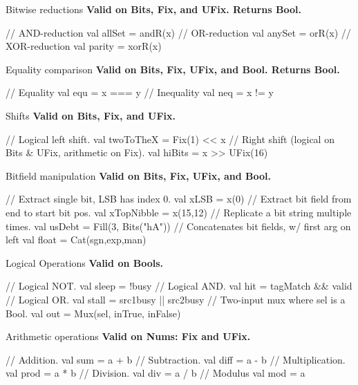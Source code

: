 \documentclass[xcolor=pdflatex,dvipsnames,table]{beamer}
\begin{document}
\begin{frame}[fragile]{Bitwise reductions}
\textbf{Valid on Bits, Fix, and UFix.  Returns Bool.}
\begin{scala}
// AND-reduction 
val allSet = andR(x)  
// OR-reduction
val anySet = orR(x)   
// XOR-reduction 
val parity = xorR(x)  
\end{scala}
\end{frame}

\begin{frame}[fragile]{Equality comparison}
\textbf{Valid on Bits, Fix, UFix, and Bool. Returns Bool.}
\begin{scala}
// Equality
val equ = x === y 
// Inequality 
val neq = x != y   
\end{scala}
\end{frame}

\begin{frame}[fragile]{Shifts}
\textbf{Valid on Bits, Fix, and UFix.}
\begin{scala}
// Logical left shift.
val twoToTheX = Fix(1) << x   
// Right shift (logical on Bits & UFix, arithmetic on Fix).
val hiBits    = x >> UFix(16) 
\end{scala}
\end{frame}

\begin{frame}[fragile]{Bitfield manipulation}
\textbf{Valid on Bits, Fix, UFix, and Bool.}
\begin{scala}
// Extract single bit, LSB has index 0.
val xLSB       = x(0)                
// Extract bit field  from end to start bit pos. 
val xTopNibble = x(15,12)            
// Replicate a bit string multiple times.
val usDebt     = Fill(3, Bits("hA")) 
// Concatenates bit fields, w/ first arg on left
val float      = Cat(sgn,exp,man)    
\end{scala}
\end{frame}

\begin{frame}[fragile]{Logical Operations}
\textbf{Valid on Bools. }
\begin{scala}
// Logical NOT. 
val sleep = !busy                     
// Logical AND.
val hit   = tagMatch && valid         
// Logical OR.
val stall = src1busy || src2busy      
// Two-input mux where sel is a Bool.  
val out   = Mux(sel, inTrue, inFalse) 
\end{scala}
\end{frame}

\begin{frame}[fragile]{Arithmetic operations}
\textbf{Valid on Nums: Fix and UFix. }
\begin{scala}
// Addition. 
val sum  = a + b  
// Subtraction.
val diff = a - b  
// Multiplication. 
val prod = a * b  
// Division.
val div  = a / b  
// Modulus
val mod  = a %
\end{scala}
\end{frame}
\end{document}
